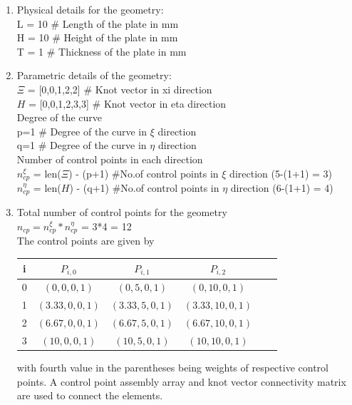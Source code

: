 \documentclass[11pt]{article}
\begin{document}
\begin{enumerate}
	\item Physical details for the geometry: \\
	L = 10 \qquad \# Length of the plate in mm \\
	H = 10 \qquad \# Height of the plate in mm \\
	T = 1 {} \qquad \# Thickness of the plate in mm \\
	
	\item Parametric details of the geometry: \\
	$\Xi$ =  [0,0,1,2,2] \qquad \# Knot vector in xi  direction \\
	$H$ = [0,0,1,2,3,3] \qquad \# Knot vector in eta direction \\
	
	Degree of the curve \\
	p=1 \qquad \# Degree of the curve in $\xi$  direction \\
	q=1 \qquad \# Degree of the curve in $\eta$ direction \\
	
	Number of control points in each direction \\
	$n_{cp}^{\xi}$  = len($\Xi$) - (p+1)  \qquad \#No.of control points in $\xi$
	direction (5-(1+1) = 3) \\
	$n_{cp}^{\eta}$ = len($H$) - (q+1)  \qquad \#No.of control points in $\eta$
	direction (6-(1+1) = 4) \\
	
	\item Total number of control points for the geometry \\
	$n_{cp} = n_{cp}^{\xi} * n_{cp}^{\eta}$ = 3*4 = 12\\
	The control points are given by
	\begin{center}
		\begin{tabular}{ |c|c|c|c|c|c| } 
			\hline
			i & $ P_{i,0} $ & $ P_{i,1} $ & $ P_{i,2} $   \\ \hline
			0 & $ (0,0,0,1) $ & $ (0,5,0,1) $ & $ (0,10,0,1) $  \\ \hline
			1 & $ (3.33,0,0,1) $ & $ (3.33,5,0,1) $ & $ (3.33,10,0,1) $  \\ \hline
			2 & $ (6.67,0,0,1) $ & $ (6.67,5,0,1) $ & $ (6.67,10,0,1) $  \\ \hline
			3 & $ (10,0,0,1) $ & $ (10,5,0,1) $ & $ (10,10,0,1) $  \\ \hline
		\end{tabular}
	\end{center}
	with fourth value in the parentheses being weights of respective control points.
	A control point assembly array and knot vector connectivity matrix are used to connect the elements.
\end{enumerate}
\end{document}
